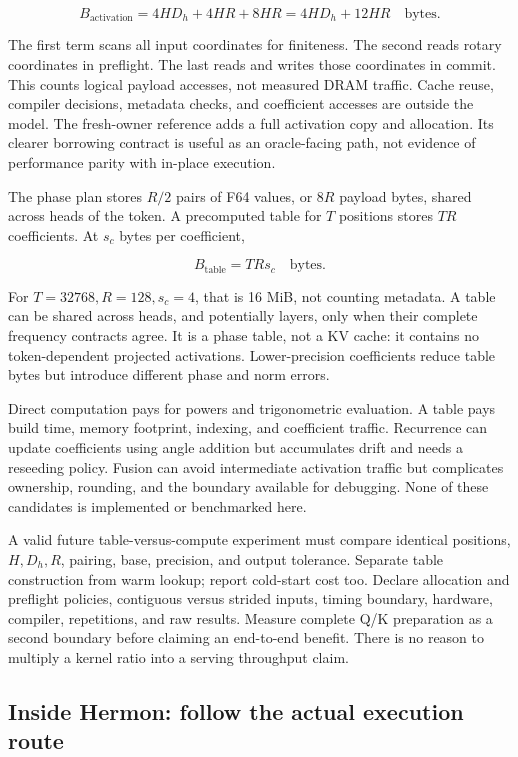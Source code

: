 \documentclass[
  10pt,
]{article}
\begin{document}
\[
B_{\mathrm{activation}}
=4HD_h+4HR+8HR
=4HD_h+12HR\quad\text{bytes}.
\]

The first term scans all input coordinates for finiteness. The second
reads rotary coordinates in preflight. The last reads and writes those
coordinates in commit. This counts logical payload accesses, not
measured DRAM traffic. Cache reuse, compiler decisions, metadata checks,
and coefficient accesses are outside the model. The fresh-owner
reference adds a full activation copy and allocation. Its clearer
borrowing contract is useful as an oracle-facing path, not evidence of
performance parity with in-place execution.

The phase plan stores \(R/2\) pairs of F64 values, or \(8R\) payload
bytes, shared across heads of the token. A precomputed table for \(T\)
positions stores \(TR\) coefficients. At \(s_c\) bytes per coefficient,

\[
B_{\mathrm{table}}=TRs_c\quad\text{bytes}.
\]

For \(T=32768,R=128,s_c=4\), that is 16 MiB, not counting metadata. A
table can be shared across heads, and potentially layers, only when
their complete frequency contracts agree. It is a phase table, not a KV
cache: it contains no token-dependent projected activations.
Lower-precision coefficients reduce table bytes but introduce different
phase and norm errors.

Direct computation pays for powers and trigonometric evaluation. A table
pays build time, memory footprint, indexing, and coefficient traffic.
Recurrence can update coefficients using angle addition but accumulates
drift and needs a reseeding policy. Fusion can avoid intermediate
activation traffic but complicates ownership, rounding, and the boundary
available for debugging. None of these candidates is implemented or
benchmarked here.

A valid future table-versus-compute experiment must compare identical
positions, \(H,D_h,R\), pairing, base, precision, and output tolerance.
Separate table construction from warm lookup; report cold-start cost
too. Declare allocation and preflight policies, contiguous versus
strided inputs, timing boundary, hardware, compiler, repetitions, and
raw results. Measure complete Q/K preparation as a second boundary
before claiming an end-to-end benefit. There is no reason to multiply a
kernel ratio into a serving throughput claim.

\subsection{Inside Hermon: follow the actual execution
route}\label{inside-hermon-follow-the-actual-execution-route}
\end{document}
